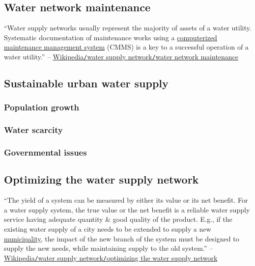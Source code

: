 \documentclass[oneside]{book}
\numberwithin{equation}{section}
\begin{document}
\subsection{Water network maintenance}
``Water supply networks usually represent the majority of assets of a water utility. Systematic documentation of maintenance works using a \href{https://en.wikipedia.org/wiki/Computerized_maintenance_management_system}{computerized maintenance management system} (CMMS) is a key to a successful operation of a water utility.'' -- \href{https://en.wikipedia.org/wiki/Water_supply_network#Water_network_maintenance}{Wikipedia\texttt{/}water supply network\texttt{/}water network maintenance}

\subsection{Sustainable urban water supply}

\subsubsection{Population growth}

\subsubsection{Water scarcity}

\subsubsection{Governmental issues}

\subsection{Optimizing the water supply network}
``The yield of a system can be measured by either its value or its net benefit. For a water supply system, the true value or the net benefit is a reliable water supply service having adequate quantity \& good quality of the product. E.g., if the existing water supply of a city needs to be extended to supply a new \href{https://en.wikipedia.org/wiki/Municipality}{municipality}, the impact of the new branch of the system must be designed to supply the new needs, while maintaining supply to the old system.'' -- \href{https://en.wikipedia.org/wiki/Water_supply_network#Optimizing_the_water_supply_network}{Wikipedia\texttt{/}water supply network\texttt{/}optimizing the water supply network}
\end{document}
